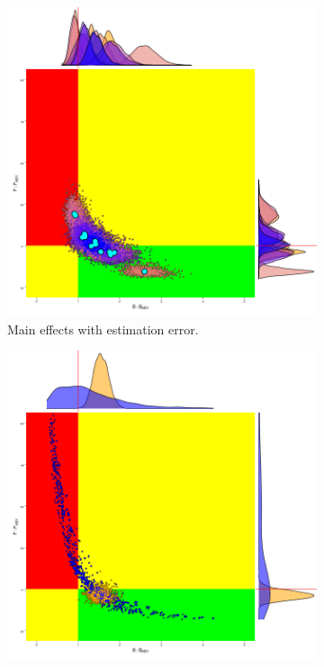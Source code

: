 \begin{figure}
        \begin{subfigure}[b]{0.5\textwidth}
               \includegraphics[width=\linewidth]{figures/kobe-main-1.png}
                \caption{Main effects with estimation error.}
                \label{fig:kobe-main}
        \end{subfigure}%
                \begin{subfigure}[b]{0.5\textwidth}
                \includegraphics[width=\linewidth]{figures/kobe-bg-1.png}

\end{subfigure}
\end{figure}
